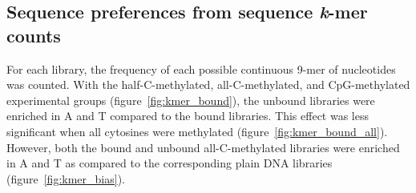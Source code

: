 \documentclass[parskip=full, numbers=noenddot]{scrreprt}
\begin{document}
\subsection{Sequence preferences from sequence \emph{k}-mer counts}
\label{ssec:nuseqpref_kmer}

For each library, the frequency of each possible continuous 9-mer of nucleotides was counted.  With the half-C-methylated, all-C-methylated, and CpG-methylated experimental groups (figure~\ref{fig:kmer_bound}), the unbound libraries were enriched in A and T compared to the bound libraries.  This effect was less significant when all cytosines were methylated (figure~\ref{fig:kmer_bound_all}).  However, both the bound and unbound all-C-methylated libraries were enriched in A and T as compared to the corresponding plain DNA libraries (figure~\ref{fig:kmer_bias}). 
\end{document}
